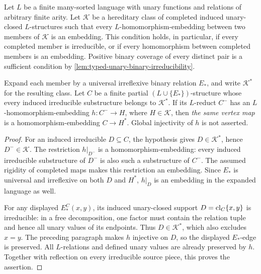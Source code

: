 \begin{lemma}
\label{lem:typed-universal-edge-hn-reflection}
Let $L$ be a finite many-sorted language with unary functions and relations
of arbitrary finite arity. Let $\mathcal K$ be a hereditary class of
completed induced unary-closed $L$-structures such that every
$L$-homomorphism-embedding between two members of $\mathcal K$ is an
embedding. This condition holds, in particular, if every completed member
is irreducible, or if every homomorphism between completed members is an
embedding. Positive binary coverage of every distinct pair is a sufficient
condition by \cref{lem:typed-unary-binary-irreducibility}.

Expand each member by a universal irreflexive binary relation $E_*$, and
write $\mathcal K^*$ for the resulting class. Let $C$ be a finite partial
$(L\cup\{E_*\})$-structure whose every induced irreducible substructure
belongs to $\mathcal K^*$. If its $L$-reduct $C^-$ has an
$L$-homomorphism-embedding $h:C^-\to H$, where $H\in\mathcal K$, then
\emph{the same vertex map} is a homomorphism-embedding $C\to H^*$.
Global injectivity of $h$ is not asserted.
\end{lemma}
\begin{proof}
For an induced irreducible $D\subseteq C$, the hypothesis gives
$D\in\mathcal K^*$, hence $D^-\in\mathcal K$.
The restriction $h|_{D^-}$ is a homomorphism-embedding: every induced
irreducible substructure of $D^-$ is also such a substructure of $C^-$.
The assumed rigidity of completed maps makes this restriction an
embedding. Since $E_*$ is universal and irreflexive on both $D$ and $H^*$,
$h|_D$ is an embedding in the expanded language as well.

For any displayed $E_*^C(x,y)$, its induced unary-closed support
$D=\operatorname{cl}_C\{x,y\}$ is irreducible: in a free decomposition, one factor
must contain the relation tuple and hence all unary values of its
endpoints. Thus $D\in\mathcal K^*$, which also excludes $x=y$.
The preceding paragraph makes $h$ injective on $D$, so the displayed
$E_*$-edge is preserved. All $L$-relations and defined unary values are
already preserved by $h$. Together with reflection on every irreducible
source piece, this proves the assertion.
\end{proof}

